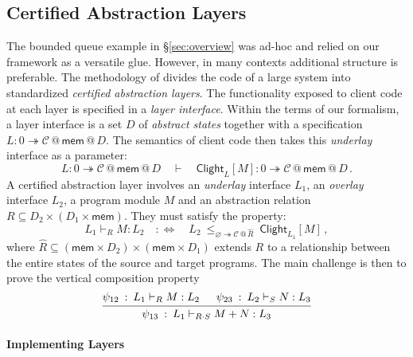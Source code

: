 \documentclass[acmsmall,nonacm]{acmart}
\newcommand{\kw}[1]{\ensuremath{ \mathsf{#1} }}
\newcommand{\emptysig}{0}
\begin{document}

\subsection{Certified Abstraction Layers} \label{sec:application:cal} %

The bounded queue example in \S\ref{sec:overview} was ad-hoc
and relied on our framework as a versatile glue.
However, in many contexts additional structure is preferable.
The methodology of \citet{popl15}
divides the code of a large system into standardized
\emph{certified abstraction layers}.
The functionality exposed to client code at each layer
is specified in a \emph{layer interface}.
Within the terms of our formalism,
a layer interface is
a set $D$ of \emph{abstract states}
together with a specification
$L : \emptysig \twoheadrightarrow \mathcal{C} \mathbin@ \kw{mem} \mathbin@ D$.
The semantics of client code then takes
this \emph{underlay} interface as a parameter:
\begin{equation} \label{eqn:layersem}
  L :
    \emptysig \twoheadrightarrow
    \mathcal{C} \mathbin@ \kw{mem} \mathbin@ D
  \quad \vdash \quad
  \kw{Clight}_L[M] :
    \emptysig \twoheadrightarrow
    \mathcal{C} \mathbin@ \kw{mem} \mathbin@ D
  \,.
\end{equation}
A certified abstraction layer
involves an \emph{underlay} interface $L_1$,
an \emph{overlay} interface $L_2$,
a program module $M$
and an abstraction relation $R \subseteq D_2 \times (D_1 \times \kw{mem})$.
They must satisfy the property:
\[
  L_1 \vdash_R M : L_2
  \quad :\Leftrightarrow \quad
  L_2 \: \le_{\varnothing \twoheadrightarrow \mathcal{C} \mathbin@ \hat{R}} \:
    \kw{Clight}_{L_1}[M]
  \,,
\]
where
$\hat{R} \subseteq (\kw{mem} \times D_2) \times (\kw{mem} \times D_1)$
extends $R$ to a relationship between
the entire states of the source and target programs.
The main challenge is then to prove the vertical composition property
\begin{equation} \label{eqn:calvcomp}
  \begin{prooftree}
    \hypo{\psi_{12} \: : \: L_1 \vdash_R M : L_2}
    \hypo{\psi_{23} \: : \: L_2 \vdash_S N : L_3}
    \infer2{\psi_{13} \: : \: L_1 \vdash_{R \cdot S} M + N : L_3}
  \end{prooftree}
\end{equation}

\paragraph{Implementing Layers}
\end{document}
